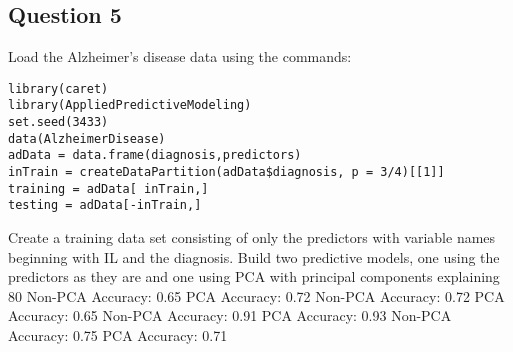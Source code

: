 \documentclass[DSS8main.tex]{subfiles}
\begin{document}
\subsection*{Question 5}
Load the Alzheimer's disease data using the commands:
\begin{framed}
\begin{verbatim}
library(caret)
library(AppliedPredictiveModeling)
set.seed(3433)
data(AlzheimerDisease)
adData = data.frame(diagnosis,predictors)
inTrain = createDataPartition(adData$diagnosis, p = 3/4)[[1]]
training = adData[ inTrain,]
testing = adData[-inTrain,]
\end{verbatim}
\end{framed}
Create a training data set consisting of only the predictors with variable names beginning with IL and the diagnosis. Build two predictive models, one using the predictors as they are and one using PCA with principal components explaining 80%
Non-PCA Accuracy: 0.65 
PCA Accuracy: 0.72
Non-PCA Accuracy: 0.72 
PCA Accuracy: 0.65
Non-PCA Accuracy: 0.91 
PCA Accuracy: 0.93
Non-PCA Accuracy: 0.75 
PCA Accuracy: 0.71
\end{document}
